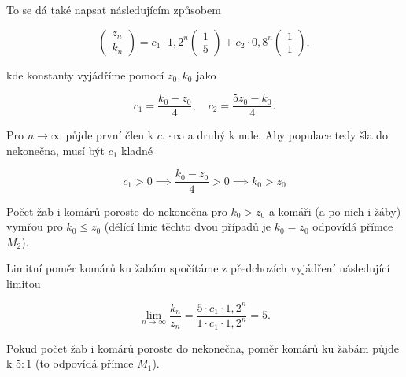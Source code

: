 \documentclass{article}
\begin{document}
To se dá také napsat následujícím způsobem

$$\begin{pmatrix} z_n \\ k_n \end{pmatrix} = c_1 \cdot 1,2^n \begin{pmatrix} 1 \\ 5 \end{pmatrix} + c_2 \cdot 0,8^n \begin{pmatrix} 1 \\ 1 \end{pmatrix},$$

kde konstanty vyjádříme pomocí $z_0, k_0$ jako

$$c_1 = \frac{k_0 - z_0}{4}, \quad c_2 = \frac{5z_0 - k_0}{4}.$$

Pro $n\to\infty$ půjde první člen k $c_1 \cdot \infty$ a druhý k nule. Aby populace tedy šla do nekonečna, musí být $c_1$ kladné

$$c_1 > 0 \implies \frac{k_0 - z_0}{4} > 0 \implies k_0 > z_0$$

Počet žab i komárů poroste do nekonečna pro $k_0 > z_0$ a komáři (a po nich i žáby) vymřou pro $k_0 \leq z_0$ (dělící linie těchto dvou případů je $k_0 = z_0$ odpovídá přímce $M_2$).

Limitní poměr komárů ku žabám spočítáme z předchozích vyjádření následující limitou

$$\lim_{n\to\infty} \frac{k_n}{z_n} = \frac{5 \cdot c_1 \cdot 1,2^n}{1\cdot c_1 \cdot 1,2^n} = 5.$$

Pokud počet žab i komárů poroste do nekonečna, poměr komárů ku žabám půjde k $5:1$ (to odpovídá přímce $M_1$).
\end{document}
